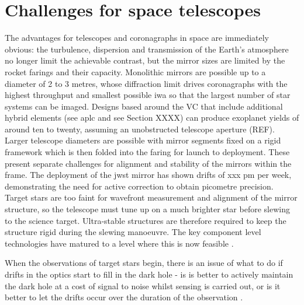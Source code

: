 \documentclass[letterpaper]{ar-1col}
\begin{document}

\section{Challenges for space telescopes}

The advantages for telescopes and coronagraphs in space are immediately obvious: the turbulence, dispersion and transmission of the Earth's atmosphere no longer limit the achievable contrast, but the mirror sizes are limited by the rocket farings and their capacity.
%
Monolithic mirrors are possible up to a diameter of 2 to 3 metres, whose diffraction limit drives coronagraphs with the highest throughput and smallest possible \ac{iwa} so that the largest number of star systems can be imaged.
%
Designs based around the VC that include additional hybrid elements (see \ac{aplc} and see Section XXXX) can produce exoplanet yields of around ten to twenty, assuming an unobstructed telescope aperture (REF).
%
Larger telescope diameters are possible with mirror segments fixed on a rigid framework which is then folded into the faring for launch to deployment.
%
These present separate challenges for alignment and stability of the mirrors within the frame.
%
The deployment of the \ac{jwst} mirror has shown drifts of xxx pm per week, demonstrating the need for active correction to obtain picometre precision.
%
Target stars are too faint for wavefront measurement and alignment of the mirror structure, so the telescope must tune up on a much brighter star before slewing to the science target.
%
Ultra-stable structures are therefore required to keep the structure rigid during the slewing manoeuvre.
%
The key component level technologies have matured to a level where this is now feasible \citep{Coyle21}.

When the observations of target stars begin, there is an issue of what to do if drifts in the optics start to fill in the dark hole - is is better to actively maintain the dark hole at a cost of signal to noise whilst sensing is carried out, or is it better to let the drifts occur over the duration of the observation \citep{Pogorelyuk19,Redmond20}.





\end{document}
